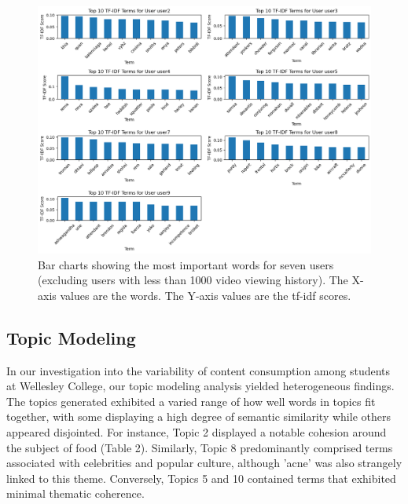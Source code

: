 \documentclass[acmtog]{acmart}
\begin{document}
\begin{figure}[ht]
  \centering
  \includegraphics[width=\linewidth]{tfidf.png}
  \caption{Bar charts showing the most important words for seven users (excluding users with less than 1000 video viewing history). The X-axis values are the words. The Y-axis values are the tf-idf scores. 
  \label{fig:tf-idf}}
\end{figure}

\subsection{Topic Modeling}
In our investigation into the variability of content consumption among students at Wellesley College, our topic modeling analysis yielded heterogeneous findings. The topics generated exhibited a varied range of how well words in topics fit together, with some displaying a high degree of semantic similarity while others appeared disjointed. For instance, Topic 2 displayed a notable cohesion around the subject of food (Table 2). Similarly, Topic 8 predominantly comprised terms associated with celebrities and popular culture, although 'acne' was also strangely linked to this theme. Conversely, Topics 5 and 10 contained terms that exhibited minimal thematic coherence.
\end{document}
